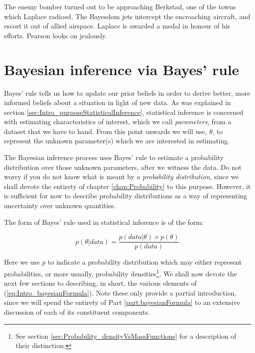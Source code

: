 \documentclass[11pt,fullpage]{book}
\begin{document}
The enemy bomber turned out to be approaching Berkstad, one of the towns which Laplace radioed. The Bayesdom jets intercept the encroaching aircraft, and escort it out of allied airspace. Laplace is awarded a medal in honour of his efforts. Pearson looks on jealously.

\section{Bayesian inference via Bayes' rule}
Bayes' rule tells us how to update our prior beliefs in order to derive better, more informed beliefs about a situation in light of new data. As was explained in section \ref{sec:Intro_purposeStatisticalInference}, statistical inference is concerned with estimating characteristics of interest, which we call \textit{parameters}, from a dataset that we have to hand. From this point onwards we will use, $\theta$, to represent the unknown parameter(s) which we are interested in estimating. 

The Bayesian inference process uses Bayes' rule to estimate a probability distribution over those unknown parameters, after we witness the data. Do not worry if you do not know what is meant by a \textit{probability distribution}, since we shall devote the entirety of chapter \ref{chap:Probability} to this purpose. However, it is sufficient for now to describe probability distributions as a way of representing uncertainty over unknown quantities.

The form of Bayes' rule used in statistical inference is of the form:

\begin{equation}\label{eq:Intro_bayesianFormula}
p(\theta|data) = \frac{p(data|\theta)\times p(\theta)}{p(data)}
\end{equation}

Here we use $p$ to indicate a probability distribution which may either represent probabilities, or more usually, probability densities\footnote{See section \ref{sec:Probability_densityVsMassFunctions} for a description of their distinction.}. We shall now devote the next few sections to describing, in short, the various elements of (\ref{eq:Intro_bayesianFormula}). Note these only provide a partial introduction, since we will spend the entirety of Part \ref{part:bayesianFormula} to an extensive discussion of each of its constituent components.
\end{document}
